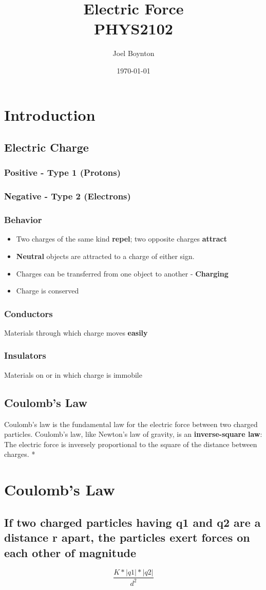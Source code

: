 \documentclass[11pt]{article}
\author{Joel Boynton}
\date{\today}
\title{Electric Force\\\medskip
\large PHYS2102}
\begin{document}
\maketitle
\tableofcontents

\section{Introduction}
\label{sec:org5992b93}
\subsection{Electric Charge}
\label{sec:org3721907}
\subsubsection{Positive - Type 1 (Protons)}
\label{sec:org1d7d034}
\subsubsection{Negative - Type 2 (Electrons)}
\label{sec:org276d4ab}
\subsubsection{Behavior}
\label{sec:org3fa8fd5}
\begin{itemize}
\item Two charges of the same kind \textbf{repel}; two opposite charges \textbf{attract}
\item \textbf{Neutral} objects are attracted to a charge of either sign.
\item Charges can be transferred from one object to another - \textbf{Charging}
\item Charge is conserved
\end{itemize}
\subsubsection{Conductors}
\label{sec:orge74d383}
Materials through which charge moves \textbf{easily}
\subsubsection{Insulators}
\label{sec:org3286750}
Materials on or in which charge is immobile
\subsection{Coulomb's Law}
\label{sec:org255bc85}
Coulomb’s law is the fundamental law for the electric force between two charged particles. Coulomb’s law, like Newton’s law of gravity, is an \textbf{inverse-square law}: The electric force is inversely proportional to the square of the distance between charges.
*
\section{Coulomb's Law}
\label{sec:org8b537ed}
\subsection{If two charged particles having q1 and q2 are a distance r apart, the particles exert forces on each other of magnitude}
\label{sec:org82905f6}


\[\frac{K*|q1|*|q2|}{d^{2}}\]
\end{document}
